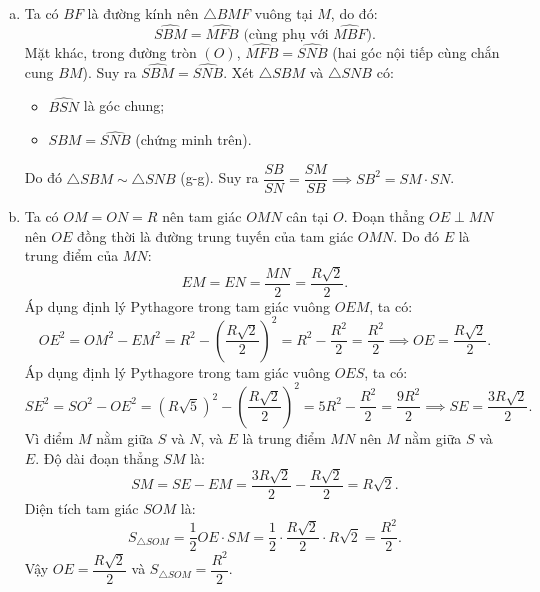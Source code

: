 \begin{bt}
{\begin{enumerate}[a)]
	$$\widehat{SAO} = 90^\circ \text{ và } \widehat{SBO} = 90^\circ.$$
	Tứ giác $SAOB$ có $\widehat{SAO} + \widehat{SBO} = 90^\circ + 90^\circ = 180^\circ$, suy ra tứ giác $SAOB$ nội tiếp đường tròn đường kính $SO$.
	\item Ta có $BF$ là đường kính nên $\triangle BMF$ vuông tại $M$, do đó:
	$$\widehat{SBM} = \widehat{MFB} \text{ (cùng phụ với } \widehat{MBF}\text{)}.$$
	Mặt khác, trong đường tròn $(O)$, $\widehat{MFB} = \widehat{SNB}$ (hai góc nội tiếp cùng chắn cung $BM$).
	Suy ra $\widehat{SBM} = \widehat{SNB}$.
	Xét $\triangle SBM$ và $\triangle SNB$ có:
	\begin{itemize}
		\item $\widehat{BSN}$ là góc chung;
		\item $\widehat{SBM} = \widehat{SNB}$ (chứng minh trên).
	\end{itemize}
	Do đó $\triangle SBM \sim \triangle SNB$ (g-g).
	Suy ra $\dfrac{SB}{SN} = \dfrac{SM}{SB} \implies SB^2 = SM \cdot SN$.
	\item Ta có $OM = ON = R$ nên tam giác $OMN$ cân tại $O$.
	Đoạn thẳng $OE \perp MN$ nên $OE$ đồng thời là đường trung tuyến của tam giác $OMN$.
	Do đó $E$ là trung điểm của $MN$:
	$$EM = EN = \dfrac{MN}{2} = \dfrac{R\sqrt{2}}{2}.$$
	Áp dụng định lý Pythagore trong tam giác vuông $OEM$, ta có:
	$$OE^2 = OM^2 - EM^2 = R^2 - \left(\dfrac{R\sqrt{2}}{2}\right)^2 = R^2 - \dfrac{R^2}{2} = \dfrac{R^2}{2} \implies OE = \dfrac{R\sqrt{2}}{2}.$$
	Áp dụng định lý Pythagore trong tam giác vuông $OES$, ta có:
	$$SE^2 = SO^2 - OE^2 = (R\sqrt{5})^2 - \left(\dfrac{R\sqrt{2}}{2}\right)^2 = 5R^2 - \dfrac{R^2}{2} = \dfrac{9R^2}{2} \implies SE = \dfrac{3R\sqrt{2}}{2}.$$
	Vì điểm $M$ nằm giữa $S$ và $N$, và $E$ là trung điểm $MN$ nên $M$ nằm giữa $S$ và $E$.
	Độ dài đoạn thẳng $SM$ là:
	$$SM = SE - EM = \dfrac{3R\sqrt{2}}{2} - \dfrac{R\sqrt{2}}{2} = R\sqrt{2}.$$
	Diện tích tam giác $SOM$ là:
	$$S_{\triangle SOM} = \dfrac{1}{2} OE \cdot SM = \dfrac{1}{2} \cdot \dfrac{R\sqrt{2}}{2} \cdot R\sqrt{2} = \dfrac{R^2}{2}.$$
	Vậy $OE = \dfrac{R\sqrt{2}}{2}$ và $S_{\triangle SOM} = \dfrac{R^2}{2}$.
\end{enumerate}
}
\end{bt}

